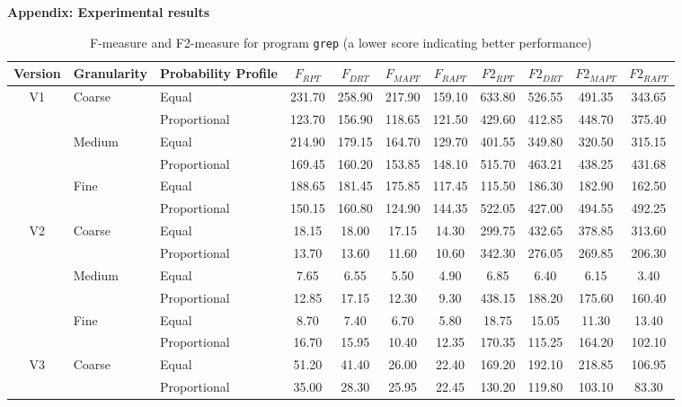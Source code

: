 \documentclass[10pt,journal,cspaper,compsoc,onecolumn]{IEEEtran}
\begin{document}
\large{\textbf{Appendix: Experimental results}}

\begin{table}[h]
\caption{F-measure and F2-measure for program \texttt{grep} (a lower score indicating better performance)}
\label{tab:Fgrep}
\centering
\begin{tabular}{|c|l|l|c|c|c|c|c|c|c|c|} \hline
Version	& Granularity	& Probability Profile	& $F_{RPT}$	& $F_{DRT}$	& $F_{MAPT}$	& $F_{RAPT}$	& $F2_{RPT}$	& $F2_{DRT}$	& $F2_{MAPT}$	 & $F2_{RAPT}$	\\ \hline
V1	& Coarse	& Equal					& 231.70	& 258.90	& 217.90	& 159.10	& 633.80	& 526.55	& 491.35	& 343.65	\\ \cline{3-11}
		&					& Proportional	& 123.70	& 156.90	& 118.65	& 121.50	& 429.60	& 412.85	& 448.70	& 375.40	\\ \cline{2-11}
		& Medium	& Equal					& 214.90	& 179.15	& 164.70	& 129.70	& 401.55	& 349.80	& 320.50	& 315.15	\\ \cline{3-11}
		&					& Proportional	& 169.45	& 160.20	& 153.85	& 148.10	& 515.70	& 463.21	& 438.25	& 431.68	\\ \cline{2-11}
		& Fine		& Equal					& 188.65	& 181.45	& 175.85	& 117.45	& 115.50	& 186.30	& 182.90	& 162.50	\\ \cline{3-11}
		&					& Proportional	& 150.15	& 160.80	& 124.90	& 144.35	& 522.05	& 427.00	& 494.55	& 492.25	\\ \hline
V2	& Coarse	& Equal					& 18.15		& 18.00		& 17.15		& 14.30		& 299.75	& 432.65	& 378.85	& 313.60	\\ \cline{3-11}
		&					& Proportional	& 13.70		& 13.60		& 11.60		& 10.60		& 342.30	& 276.05	& 269.85	& 206.30	\\ \cline{2-11}
		& Medium	& Equal					& 7.65		& 6.55		& 5.50		& 4.90		& 6.85		& 6.40		& 6.15		& 3.40		\\ \cline{3-11}
		&					& Proportional	& 12.85		& 17.15		& 12.30		& 9.30		& 438.15	& 188.20	& 175.60	& 160.40	\\ \cline{2-11}
		& Fine		& Equal					& 8.70		& 7.40		& 6.70		& 5.80		& 18.75		& 15.05		& 11.30		& 13.40		\\ \cline{3-11}
		&					& Proportional	& 16.70		& 15.95		& 10.40		& 12.35		& 170.35	& 115.25	& 164.20	& 102.10	\\ \hline
V3	& Coarse	& Equal					& 51.20	& 41.40	& 26.00	& 22.40	& 169.20	& 192.10	& 218.85	& 106.95	\\ \cline{3-11}
		&					& Proportional	& 35.00	& 28.30	& 25.95	& 22.45	& 130.20	& 119.80	& 103.10	& 83.30		\\ \cline{2-11}

\end{tabular}
\end{table}
\end{document}
